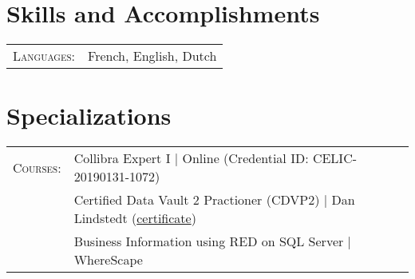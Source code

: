 \documentclass[a4paper,11pt]{article}
\begin{document}
\section{Skills and Accomplishments}
\begin{tabular}{rl}
  \textsc{Languages:}& French, English, Dutch\\
\end{tabular}

\section{Specializations}
\begin{tabular}{rl}
  \textsc{Courses:}
  &Collibra Expert I | Online (Credential ID: CELIC-20190131-1072)\\
  &Certified Data Vault 2 Practioner (CDVP2) | Dan Lindstedt (\href{http://keyldv.com/}{certificate})\\
  &Business Information using RED on SQL Server | WhereScape
\end{tabular}
\end{document}
